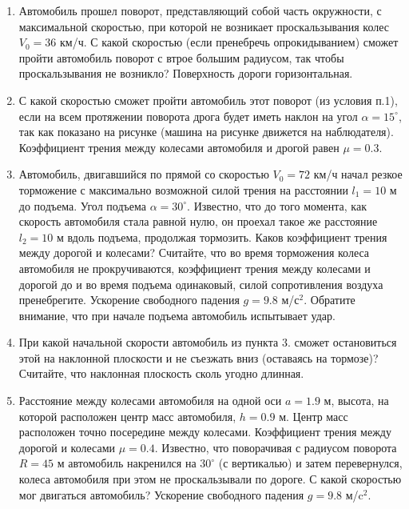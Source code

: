 
\begin{enumerate}
    \item Автомобиль прошел поворот, представляющий собой часть окружности, с максимальной скоростью, при которой не возникает проскальзывания колес $V_0 = 36$ км/ч. С какой скоростью (если пренебречь опрокидыванием) сможет пройти автомобиль поворот с втрое большим радиусом, так чтобы проскальзывания не возникло? Поверхность дороги горизонтальная.
    \item С какой скоростью сможет пройти автомобиль этот поворот (из условия п.1), если на всем протяжении поворота дрога будет иметь наклон на угол $\alpha = 15^{\circ}$, так как показано на рисунке (машина на рисунке движется на наблюдателя).  Коэффициент трения между колесами автомобиля и дрогой равен $\mu =0.3$.
    

    \item Автомобиль, двигавшийся по прямой со скоростью $V_0 = 72$ км/ч начал резкое торможение с максимально возможной силой трения на расстоянии $l_1 = 10$ м до подъема. Угол подъема $\alpha=30^{\circ}$. Известно, что до того момента, как скорость автомобиля стала равной нулю, он проехал такое же расстояние $l_2 = 10$ м вдоль подъема, продолжая тормозить. Каков коэффициент трения между дорогой и колесами? Считайте, что во время торможения колеса автомобиля не прокручиваются, коэффициент трения между колесами и дорогой до и во время подъема одинаковый, силой сопротивления воздуха пренебрегите. Ускорение свободного падения $g = 9.8$ м/с$^2$. Обратите внимание, что при начале подъема автомобиль испытывает удар.
    \item При какой начальной скорости автомобиль из пункта 3. сможет остановиться этой на наклонной плоскости и не съезжать вниз (оставаясь на тормозе)? Считайте, что наклонная плоскость сколь угодно длинная.
    \item Расстояние между колесами автомобиля на одной оси $a = 1.9$ м, высота, на которой расположен центр масс автомобиля, $h = 0.9$ м. Центр масс расположен точно посередине между колесами. Коэффициент трения между дорогой и колесами $\mu = 0.4$. Известно, что поворачивая с радиусом поворота $R = 45$ м автомобиль накренился на $30^{\circ}$ (с вертикалью) и затем перевернулся, колеса автомобиля при этом не проскальзывали по дороге. С какой скоростью мог двигаться автомобиль? Ускорение свободного падения $g = 9.8$ м/c$^2$.
\end{enumerate}